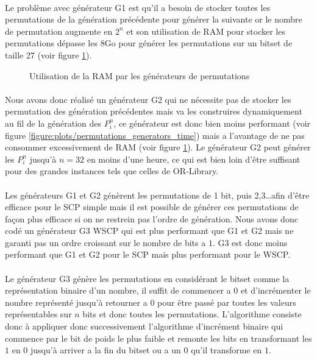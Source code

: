 \documentclass[12pt,letterpaper,twoside]{article}
\begin{document}
			\paragraph*{}
				Le problème avec générateur G1 est qu'il a besoin de stocker toutes les permutations de la génération précédente pour générer la suivante or le nombre de permutation augmente en \(2^n\) et son utilisation de RAM pour stocker les permutations dépasse les 8Go pour générer les permutations sur un bitset de taille 27 (voir figure \ref{figure:permutations_generators_ram}).
			\begin{figure}[H]
				\centering
				\caption{Utilisation de la RAM par les générateurs de permutations}
				\label{figure:permutations_generators_ram}
			\end{figure}
			\paragraph*{}
				Nous avons donc réalisé un générateur G2 qui ne nécessite pas de stocker les permutation des génération précédentes mais va les construires dynamiquement au fil de la génération des \(P_i^n\), ce générateur est donc bien moins performant (voir figure \ref{figure:plots/permutations_generators_time}) mais a l'avantage de ne pas consommer excessivement de RAM (voir figure \ref{figure:permutations_generators_ram}). Le générateur G2 peut générer les \(P_i^n\) jusqu'à \(n = 32\) en moins d'une heure, ce qui est bien loin d’être suffisant pour des grandes instances tels que celles de OR-Library.
			\paragraph*{}
				Les générateurs G1 et G2 génèrent les permutations de 1 bit, puis 2,3\ldots afin d’être efficace pour le SCP simple mais il est possible de générer ces permutations de façon plus efficace si on ne restrein pas l'ordre de génération. Nous avons donc codé un générateur G3 WSCP qui est plus performant que G1 et G2 mais ne garanti pas un ordre croissant sur le nombre de bits a \(1\). G3 est donc moins performant que G1 et G2 pour le SCP mais plus performant pour le WSCP.
			\paragraph*{}
				Le générateur G3 génère les permutations en considérant le bitset comme la représentation binaire d'un nombre, il suffit de commencer a 0 et d'incrémenter le nombre représenté jusqu'à retourner a 0 pour être passé par toutes les valeurs représentables sur \(n\) bits et donc toutes les permutations. L'algorithme consiste donc à appliquer donc successivement l'algorithme d'incrément binaire qui commence par le bit de poids le plus faible et remonte les bits en transformant les \(1\) en \(0\) jusqu’à arriver a la fin du bitset ou a un \(0\) qu'il transforme en \(1\).
\end{document}
